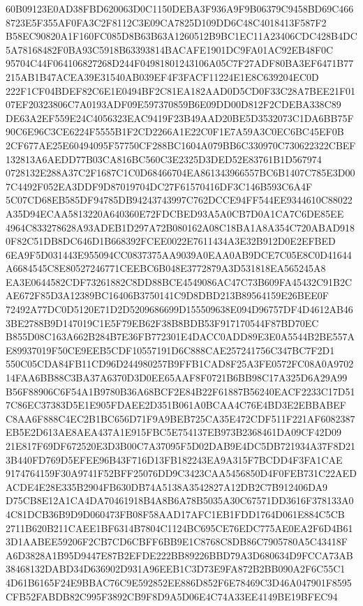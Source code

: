 \documentclass[UTF8,fontset=fandol,zihao=-4,a4paper]{ctexart}
\begin{document}
{{60B09123E0AD38FBD620063D0C1150DEBA3F936A9F9B06379C9458BD69C4668723E5F355AF0FA3C2F8112C3E09CA7825D109DD6C48C4018413F587F2
B58EC90820A1F160FC085D8B63B63A1260512B9BC1EC11A23406CDC428B4DC5A78168482F0BA93C5918B63393814BACAFE1901DC9FA01AC92EB48F0C
95704C44F064106827268D244F04981801243106A05C7F27ADF80BA3EF6471B77215AB1B47ACEA39E31540AB039EF4F3FACF11224E1E8C639204EC0D
222F1CF04BDEF82C6E1E0494BF2C81EA182AAD0D5CD0F33C28A7BEE21F0107EF20323806C7A0193ADF09E597370859B6E09DD00D812F2CDEBA338C89
DE63A2EF559E24C4056323EAC9419F23B49AAD20BE5D3532073C1DA6BB75F90C6E96C3CE6224F5555B1F2CD2266A1E22C0F1E7A59A3C0EC6BC45EF0B
2CF677AE25E60494095F57750CF288BC1604A079BB6C330970C730622322CBEF132813A6AEDD77B03CA816BC560C3E2325D3DED52E83761B1D567974
0728132E288A37C2F1687C1C0D68466704EA861343966557BC6B1407C785E3D007C4492F052EA3DDF9D87019704DC27F61570416DF3C146B593C6A4F
5C07CD68EB585DF94785DB94243743997C762DCCE94FF544EE9344610C88022A35D94ECAA5813220A640360E72FDCBED93A5A0CB7D0A1CA7C6DE85EE
4964C833278628A93ADEB1D297A72B080162A08C18BA1A8A354C720ABAD9180F82C51DB8DC646D1B668392FCEE0022E7611434A3E32B912D0E2EFBED
6EA9F5D031443E955094CC0837375AA9039A0EAA0AB9DCE7C05E8C0D41644A6684545C8E80527246771CEEBC6B048E3772879A3D531818EA565245A8
EA3E0644582CDF73261882C8DD88BCE4549086AC47C73B609FA45432C91B2CAE672F85D3A12389BC16406B3750141C9D8DBD213B89564159E26BEE0F
72492A77DC0D5120E71D2D5209686699D155509638E094D96757DF4D4612AB463BE2788B9D147019C1E5F79EB62F38B8BDB53F917170544F87BD70EC
B855D08C163A662B284B7E36FB772301E4DACC0ADD89E3E0A5544B2BE557AE89937019F50CE9EEB5CDF10557191D6C888CAE257241756C347BC7F2D1
550C05CDA84FB11CD96D244980257B9FFB1CAD8F25A3FE0572FC08A0A970214FAA6BB88C3BA37A6370D3D0EE65AAF8F0721B6BB98C17A325D6A29A99
B56F88906C6F54A1B9780B36A68BCF2E84B22F61887B56240EACF2233C17D517C86EC37383D5E1E905FDAEE2D351B061A0BCAA4C76E4BD3E2EBBABEF
C8AA6F888C4EC2B1BC656D71F9A9BEB725CA35E472CDF511F221AF6082387EB5E2D613AE8AEA437A1E915FBC5E754137EB973B2368461DA09CF42D09
21E817F69DF672520E3D3B00C7A37095F5D02DAB9E4DC5DB721934A37F8D213B440FD769D5EFEE96B43F716D13FB182243EA9A315F7BCDD4F3FA1CAE
9174764159F30A9741F52BFF25076DD9C3423CAA5456850D4F0FEB731C22AEDACDE4E28E335B2904FB630DB74A5138A3542827A12DB2C7B912406DA9
D75CB8E12A1CA4DA70461918B4A8B6A78B5035A30C67571DD3616F378133A04C81DCB36B9D9D060473FB08F58AAD17AFC1EB1FDD1764D061E884C5CB
2711B620B211CAEE1BF6314B7804C1124BC695CE76EDC775AE0EA2F6D4B613D1AABEE59206F2CB7CD6CBFF6BB9E1C8768C8DB86C7905780A5C43418F
A6D3828A1B95D9447E87B2EFDE222BB89226BBD79A3D680634D9FCCA73AB38468132DABD34D636902D931A96EEB1C3D73E9FA872B2BB090A2F6C55C1
4D61B6165F24E9BBAC76C9E592852EE886D852F6E78469C3D46A047901F8595CFB52FABDB82C995F3892CB9F8D9A5D06E4C74A33EE4149BE19BFEC94
}}
\end{document}

